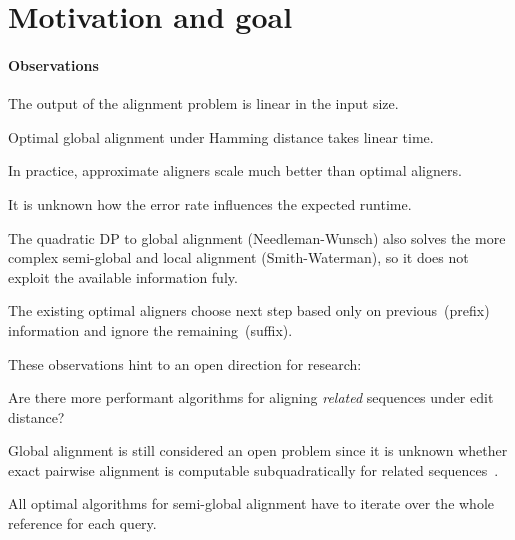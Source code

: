 \section*{Motivation and goal}

\paragraph{Observations}

\begin{observation}
    The output of the alignment problem is linear in the input size.
\end{observation}

\begin{observation}
    Optimal global alignment under Hamming distance takes linear time.
\end{observation}

\begin{observation}
    In practice, approximate aligners scale much better than optimal aligners.
\end{observation}

It is unknown how the error rate influences the expected runtime.

\begin{observation}
    The quadratic DP to global alignment (Needleman-Wunsch) also solves the more
    complex semi-global and local alignment (Smith-Waterman), so it does not
    exploit the available information fuly.
\end{observation}

\begin{observation}
    The existing optimal aligners choose next step based only on
    previous~(prefix) information and ignore the remaining~(suffix).
\end{observation}

These observations hint to an open direction for research:

\begin{problem}
    Are there more performant algorithms for aligning \emph{related} sequences
    under edit distance?
\end{problem}

Global alignment is still considered an open problem since it is unknown whether
exact pairwise alignment is computable subquadratically for related
sequences~\citep{medvedev2022theoretical}. 

\begin{observation}
    All optimal algorithms for semi-global alignment have to iterate over the
    whole reference for each query.
\end{observation}

